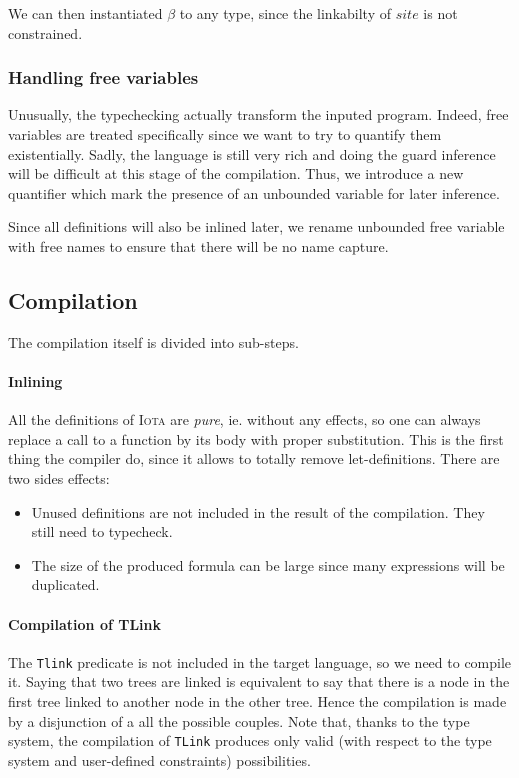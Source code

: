 \documentclass[10pt,a4paper]{article}
\newcommand\Iota{\textsc{Iota}}
\newcommand{\ocaml}{\texttt}
\begin{document}
We can then instantiated $\beta$ to any type, since the linkabilty of $site$ is not constrained.

\subsubsection{Handling free variables}
Unusually, the typechecking actually transform the inputed program. Indeed, free variables are treated specifically since we want to try to quantify them existentially. Sadly, the language is still very rich and doing the guard inference will be difficult at this stage of the compilation. Thus, we introduce a new quantifier which mark the presence of an unbounded variable for later inference.

Since all definitions will also be inlined later, we rename unbounded free variable with free names to ensure that there will be no name capture.

\subsection{Compilation}
The compilation itself is divided into sub-steps.

\paragraph{Inlining}
All the definitions of \Iota{} are \emph{pure}, ie. without any effects, so one can always replace a call to a function by its body with proper substitution. This is the first thing the compiler do, since it allows to totally remove let-definitions. There are two sides effects:

\begin{itemize}
\item Unused definitions are not included in the result of the compilation. They still need to typecheck.
\item The size of the produced formula can be large since many expressions will be duplicated.
\end{itemize}

\paragraph{Compilation of TLink}
\label{para:tlink}
The \ocaml{Tlink} predicate is not included in the target language, so we need to compile it.
Saying that two trees are linked is equivalent to say that there is a node in the first tree linked to another node in the other tree. Hence the compilation is made by a disjunction of a all the possible couples.
Note that, thanks to the type system, the compilation of \ocaml{TLink} produces only valid (with respect to the type system and user-defined constraints) possibilities.
\end{document}
